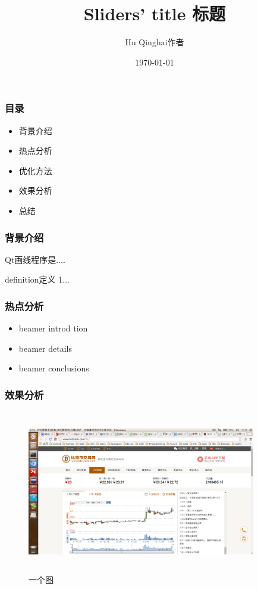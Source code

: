 \documentclass[12pt]{beamer}
\title{Sliders' title 标题}
\author{Hu Qinghai作者}
\date{\today}
\begin{document}
\begin{CJK}{UTF8}{gbsn}     %
    \begin{frame} %
        \titlepage   
    \end{frame}

    \begin{frame}
        \frametitle{目录}
        \begin{itemize}
         \item 背景介绍 \pause
         \item 热点分析 \pause
		 \item 优化方法 \pause
         \item 效果分析 \pause
		 \item 总结
        \end{itemize}
        \tableofcontents
    \end{frame}

    \begin{frame}
        \frametitle{背景介绍}
        \pause
        Qt画线程序是....
        \begin{definition}
            definition定义 1...
        \end{definition}
    \end{frame}

    \begin{frame}
        \frametitle{热点分析}\pause
        \begin{itemize}
         \item beamer introd tion \pause
         \item beamer details \pause
         \item beamer conclusions
        \end{itemize}
    \end{frame}

    \begin{frame}
        \frametitle{效果分析}\pause
		\begin{figure}[!htbp]
			\centering
			\includegraphics[width=10.00cm,height=7.10cm]{test.eps}
			\caption{一个图}
		\end{figure}
    \end{frame}


\end{CJK}
\end{document}
